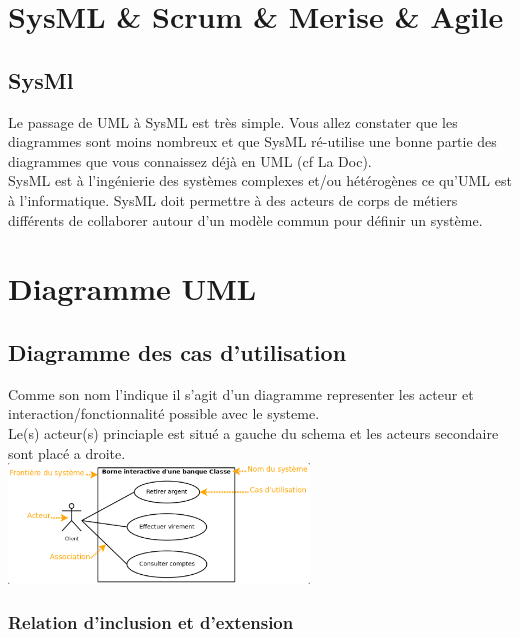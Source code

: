 \documentclass[a4paper,12pt,openany]{book}
\begin{document}
\newpage

\chapter{SysML \& Scrum \& Merise \& Agile}

\section{SysMl}
Le passage de UML à SysML est très simple. Vous allez constater que les diagrammes sont moins nombreux et que SysML ré-utilise une bonne partie des diagrammes que vous connaissez déjà en UML (cf La Doc).\\
SysML est à l'ingénierie des systèmes complexes et/ou hétérogènes ce qu'UML est à l'informatique. SysML doit permettre à des acteurs de corps de métiers différents de collaborer autour d'un modèle commun pour définir un système.\\

\newpage

\chapter{Diagramme UML}

\section{Diagramme des cas d'utilisation}

Comme son nom l'indique il s'agit d'un diagramme representer les acteur et interaction/fonctionnalité possible avec le systeme.\\
Le(s) acteur(s) princiaple est situé a gauche du schema et les acteurs secondaire sont placé a droite.\\
\includegraphics[width=0.60\textwidth,center]{img/diag_use_case.png}


\subsection{Relation d'inclusion et d'extension}
\end{document}
